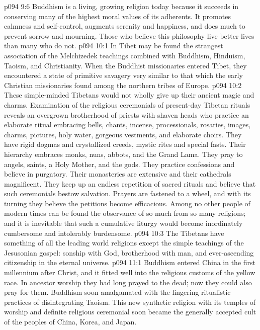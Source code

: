 \vs p094 9:6 Buddhism is a living, growing religion today because it succeeds in conserving many of the highest moral values of its adherents. It promotes calmness and self\hyp{}control, augments serenity and happiness, and does much to prevent sorrow and mourning. Those who believe this philosophy live better lives than many who do not.
\vs p094 10:1 In Tibet may be found the strangest association of the Melchizedek teachings combined with Buddhism, Hinduism, Taoism, and Christianity. When the Buddhist missionaries entered Tibet, they encountered a state of primitive savagery very similar to that which the early Christian missionaries found among the northern tribes of Europe.
\vs p094 10:2 These simple\hyp{}minded Tibetans would not wholly give up their ancient magic and charms. Examination of the religious ceremonials of present\hyp{}day Tibetan rituals reveals an overgrown brotherhood of priests with shaven heads who practice an elaborate ritual embracing bells, chants, incense, processionals, rosaries, images, charms, pictures, holy water, gorgeous vestments, and elaborate choirs. They have rigid dogmas and crystallized creeds, mystic rites and special fasts. Their hierarchy embraces monks, nuns, abbots, and the Grand Lama. They pray to angels, saints, a Holy Mother, and the gods. They practice confessions and believe in purgatory. Their monasteries are extensive and their cathedrals magnificent. They keep up an endless repetition of sacred rituals and believe that such ceremonials bestow salvation. Prayers are fastened to a wheel, and with its turning they believe the petitions become efficacious. Among no other people of modern times can be found the observance of so much from so many religions; and it is inevitable that such a cumulative liturgy would become inordinately cumbersome and intolerably burdensome.
\vs p094 10:3 The Tibetans have something of all the leading world religions except the simple teachings of the Jesusonian gospel: sonship with God, brotherhood with man, and ever\hyp{}ascending citizenship in the eternal universe.
\vs p094 11:1 Buddhism entered China in the first millennium after Christ, and it fitted well into the religious customs of the yellow race. In ancestor worship they had long prayed to the dead; now they could also pray for them. Buddhism soon amalgamated with the lingering ritualistic practices of disintegrating Taoism. This new synthetic religion with its temples of worship and definite religious ceremonial soon became the generally accepted cult of the peoples of China, Korea, and Japan.
